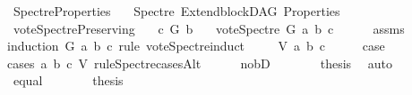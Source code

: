 %
\begin{isabellebody}%
%
%
\isadelimtheory
%
\endisadelimtheory
%
\isatagtheory
{}\isamarkupfalse%
\ Spectre{\isacharunderscore}{\kern0pt}Properties\isanewline
\ \ \ Spectre\ Extend{\isacharunderscore}{\kern0pt}blockDAG\ Properties\isanewline
{}%
\endisatagtheory
{\isafoldtheory}%
%
\isadelimtheory
%
\endisadelimtheory
%
\isadelimdocument
%
\endisadelimdocument
%
\isatagdocument
%
\isamarkuptrue%
%
\isamarkuptrue%
%
\endisatagdocument
{\isafolddocument}%
%
\isadelimdocument
%
\endisadelimdocument
{}\isamarkupfalse%
\ vote{\isacharunderscore}{\kern0pt}Spectre{\isacharunderscore}{\kern0pt}Preserving{\isacharcolon}{\kern0pt}\isanewline
\ \ \ {\isachardoublequoteopen}c\ {\isasymrightarrow}\isactrlsup {\isacharplus}{\kern0pt}\isactrlbsub G\isactrlesub \ b{\isachardoublequoteclose}\isanewline
\ \ \ {\isachardoublequoteopen}vote{\isacharunderscore}{\kern0pt}Spectre\ G\ a\ b\ c\ {\isasymin}\ {\isacharbraceleft}{\kern0pt}{}{\isacharcomma}{\kern0pt}{}{\isacharbraceright}{\kern0pt}{\isachardoublequoteclose}\isanewline
%
\isadelimproof
\ \ %
\endisadelimproof
%
\isatagproof
{}\isamarkupfalse%
\ assms\isanewline
{}\isamarkupfalse%
{\isacharparenleft}{\kern0pt}induction\ G\ a\ b\ c\ rule{\isacharcolon}{\kern0pt}\ vote{\isacharunderscore}{\kern0pt}Spectre{\isachardot}{\kern0pt}induct{\isacharparenright}{\kern0pt}\isanewline
\ \ \isamarkupfalse%
\ {\isacharparenleft}{\kern0pt}{}\ V\ a\ b\ c{\isacharparenright}{\kern0pt}\isanewline
\ \ \isamarkupfalse%
\ \isamarkupfalse%
\ {\isacharquery}{\kern0pt}case\ \isanewline
\ \ \isamarkupfalse%
{\isacharparenleft}{\kern0pt}cases\ a\ b\ c\ V\ rule{\isacharcolon}{\kern0pt}Spectre{\isacharunderscore}{\kern0pt}casesAlt{\isacharparenright}{\kern0pt}\isanewline
\ \ \ \ \isamarkupfalse%
\ no{\isacharunderscore}{\kern0pt}bD\isanewline
\ \ \ \ \isamarkupfalse%
\ \isamarkupfalse%
\ {\isacharquery}{\kern0pt}thesis\ \isamarkupfalse%
\ auto\isanewline
\ \ \isamarkupfalse%
\isanewline
\ \ \ \ \isamarkupfalse%
\ equal\isanewline
\ \ \ \ \isamarkupfalse%
\ \isamarkupfalse%
\ {\isacharquery}{\kern0pt}thesis\ \ \isamarkupfalse%

\end{isabellebody}
